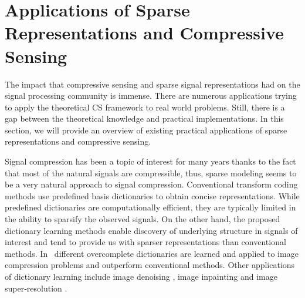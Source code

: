 \documentclass[journal]{IEEEtran}
\begin{document}
\section{Applications of Sparse Representations and Compressive Sensing} \label{sec:5}

The impact that compressive sensing and sparse signal representations had on the signal processing community is immense. There are numerous applications trying to apply the theoretical CS framework to real world problems. Still, there is a gap between the theoretical knowledge and practical implementations. In this section, we will provide an overview of existing practical applications of sparse representations and compressive sensing.

Signal compression has been a topic of interest for many years thanks to the fact that most of the natural signals are compressible, thus, sparse modeling seems to be a very natural approach to signal compression. Conventional transform coding methods use predefined basis dictionaries to obtain concise representations. While predefined dictionaries are computationally efficient, they are typically limited in the ability to sparsify the observed signals. On the other hand, the proposed dictionary learning methods enable discovery of underlying structure in signals of interest and tend to provide us with sparser representations than conventional methods. In~\cite{nejati2016boosted, horev2012adaptive, skretting2011image} different overcomplete dictionaries are learned and applied to image compression problems and outperform conventional methods. Other applications of dictionary learning include image denoising \cite{Elad2008}, image inpainting \cite{Shen2009, Mairal2008} and image super-resolution \cite{yang2010image, kim2010single, yang2008image}.
\end{document}
